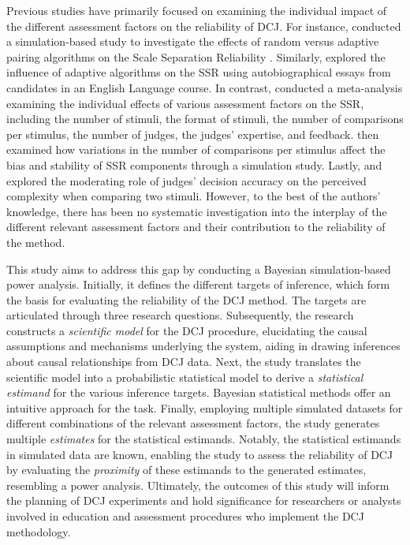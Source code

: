 \documentclass[
  12pt]{article}
\begin{document}
Previous studies have primarily focused on examining the individual
impact of the different assessment factors on the reliability of DCJ.
For instance, \citet{Bramley_2015} conducted a simulation-based study to
investigate the effects of random versus adaptive pairing algorithms on
the Scale Separation Reliability \citep[SSR,][]{Pollitt_2012b}.
Similarly, \citet{Bramley_et_al_2019} explored the influence of adaptive
algorithms on the SSR using autobiographical essays from candidates in
an English Language course. In contrast, \citet{Verhavert_et_al_2019}
conducted a meta-analysis examining the individual effects of various
assessment factors on the SSR, including the number of stimuli, the
format of stimuli, the number of comparisons per stimulus, the number of
judges, the judges' expertise, and feedback.
\citet{Crompvoets_et_al_2022} then examined how variations in the number
of comparisons per stimulus affect the bias and stability of SSR
components through a simulation study. Lastly,
\citet{vanDaal_et_al_2017} and \citet{Gijsen_et_al_2021} explored the
moderating role of judges' decision accuracy on the perceived complexity
when comparing two stimuli. However, to the best of the authors'
knowledge, there has been no systematic investigation into the interplay
of the different relevant assessment factors and their contribution to
the reliability of the method.

This study aims to address this gap by conducting a Bayesian
simulation-based power analysis. Initially, it defines the different
targets of inference, which form the basis for evaluating the
reliability of the DCJ method. The targets are articulated through three
research questions. Subsequently, the research constructs a
\emph{scientific model} for the DCJ procedure, elucidating the causal
assumptions and mechanisms underlying the system, aiding in drawing
inferences about causal relationships from DCJ data. Next, the study
translates the scientific model into a probabilistic statistical model
to derive a \emph{statistical estimand} for the various inference
targets. Bayesian statistical methods offer an intuitive approach for
the task. Finally, employing multiple simulated datasets for different
combinations of the relevant assessment factors, the study generates
multiple \emph{estimates} for the statistical estimands. Notably, the
statistical estimands in simulated data are known, enabling the study to
assess the reliability of DCJ by evaluating the \emph{proximity} of
these estimands to the generated estimates, resembling a power analysis.
Ultimately, the outcomes of this study will inform the planning of DCJ
experiments and hold significance for researchers or analysts involved
in education and assessment procedures who implement the DCJ
methodology.
\end{document}
